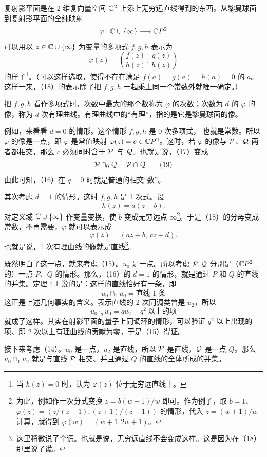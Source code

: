 复射影平面是在 2 维复向量空间 $\mathbb{C}^2$ 上添上无穷远直线得到的东西。从黎曼球面到复射影平面的全纯映射
\[
\varphi : \mathbb{C}\cup\{\infty\} \longrightarrow \mathbb{C}P^2
\]
可以用以 $z\in\mathbb{C}\cup\{\infty\}$ 为变量的多项式 $f,g,h$ 表示为
\begin{equation}
\varphi(z) = \left(\frac{f(z)}{h(z)},\ \frac{g(z)}{h(z)}\right) \tag{18}
\end{equation}
的样子\footnote{当 $h(z)=0$ 时，认为 $\varphi(z)$ 位于无穷远直线上。}。（可以这样选取，使得不存在满足 $f(a)=g(a)=h(a)=0$ 的 $a$。这样一来，（18）的表示除了把 $f,g,h$ 一起乘上同一个常数外就唯一确定。）

把 $f,g,h$ 看作多项式时，次数中最大的那个数称为 $\varphi$ 的次数；次数为 $d$ 的 $\varphi$ 的像，称为 $d$ 次有理曲线。有理曲线中的“有理”，指的是它是黎曼球面的像。

例如，来看看 $d=0$ 的情形。这个情形 $f,g,h$ 是 0 次多项式，
也就是常数。所以 $\varphi$ 的像是一点，即 $\varphi$ 是常值映射 $\varphi(z)=c\in\mathbb{C}P^2$。这时，若 $\varphi$ 的像与 $\mathcal{P}$、$\mathcal{Q}$ 两者都相交，那么 $c$ 必须同时含于 $\mathcal{P}$ 与 $\mathcal{Q}$。也就是说，（17）变成
\begin{equation}
\mathcal{P}\cap_0\mathcal{Q} = \mathcal{P}\cap\mathcal{Q} \tag{19}
\end{equation}
由此可知，（16）在 $q=0$ 时就是普通的相交“数”。

其次考虑 $d=1$ 的情形。这时 $f,g,h$ 是 1 次式。设
\[
h(z) = a(z-b).
\]
对定义域 $\mathbb{C}\cup\{\infty\}$ 作变量变换，使 $b$ 变成无穷远点 $\infty$\footnote{为此，例如作一次分式变换 $z=b(w+1)/w$ 即可。作为例子，取 $b=1$、$\varphi(z)=(z/(z-1),(z+1)/(z-1))$ 的情形，代入 $z=(w+1)/w$ 计算，就得到 $\varphi(w)=(w+1,2w+1)$。}。于是（18）的分母变成常数，不再需要，$\varphi$ 就可以表示成
\[
\varphi(z) = (az+b,\ cz+d).
\]
也就是说，1 次有理曲线的像就是直线\footnote{这里稍微说了个谎。也就是说，无穷远直线不会变成这样。这是因为在（18）那里说了谎。}。

既然明白了这一点，就来考虑（15）。$u_0$ 是一点。所以考虑 $\mathcal{P},\mathcal{Q}$ 分别是（$\mathbb{C}P^2$ 的）一点 $P$、$Q$ 的情形。那么，（16）的 $d=1$ 的情形，就是通过 $P$ 和 $Q$ 的直线的并集。定理 4.1 说的是：这样的直线恰好有一条，即
\[
u_0\cap_1 u_0 = \text{直线 1 条}
\]
这正是上述几何事实的含义。表示直线的 2 次同调类曾是 $u_2$，所以
\[
u_0\cdot_q u_0 = qu_2 + q^2\ \text{以上的项}
\]
就成了这样。其实在射影平面的量子上同调环的情形，可以验证 $q^2$ 以上出现的项、即 2 次以上有理曲线的贡献为零，于是（15）得证。

接下来考虑（14）。$u_0$ 是一点，$u_2$ 是直线，所以 $\mathcal{P}$ 是直线，$\mathcal{Q}$ 是一点 $Q$。那么 $u_0\cap_1 u_2$ 就是与直线 $\mathcal{P}$ 相交、并且通过 $Q$ 的直线的全体所成的并集。

